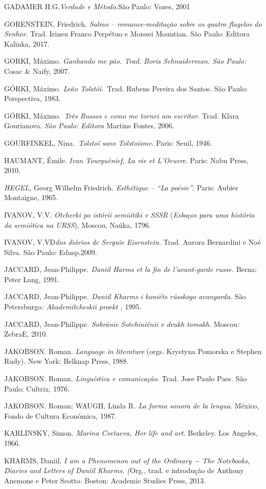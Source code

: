 GADAMER H.G.\emph{Verdade e Método.}São Paulo: Vozes, 2001

GORENSTEIN, Friedrich. \emph{Salmo -- romance-meditação sobre os quatro
flagelos do Senhor}. Trad. Irineu Franco Perpétuo e Moissei Mountian.
São Paulo: Editora Kalinka, 2017.

GORKI, Máximo. \emph{Ganhando me pão. Trad. Boris Schnaiderman. São
Paulo:} Cosac \& Naify, 2007.

GÓRKI, Máximo\emph{. Leão Tolstói}.~Trad. Rubens Pereira dos Santos. São
Paulo: Perspectiva, 1983.

GÓRKI, Máximo.~\emph{Três Russos e como me tornei um escritor.} Trad.
Klara Gourianova. \emph{São Paulo: Editora} Martins Fontes, 2006.

GOURFINKEL, Nina.~\emph{Tolstoï sans Tolstoïsme}. Paris: Seuil, 1946.

HAUMANT, Émile. \emph{Ivan Tourguénief, La vie et L'Oeuvre}. Paris: Nabu
Press, 2010.

\emph{HEGEL,} Georg Wilhelm Friedrich. \emph{Esthétique -- ``La
poésie''}. Paris: Aubier Montaigne, 1965.

IVANOV, V.V. \emph{Otcherki po istórii semiótiki v SSSR} (\emph{Esboços
para uma história da semiótica na URSS}), Moscou, Naúka, 1796.

IVANOV, V.VD\emph{dos diários de Serguie Eisenstein.} Trad. Aurora
Bernardini e Noé Silva. São Paulo: Edusp,2009.

JACCARD, Jean-Philippe. \emph{Daniil Harms et la fin de l'avant-garde
russe.} Berna: Peter Lang, 1991.~

JACCARD, Jean-Philippe\emph{. Daniil Kharms i koniéts rússkogo
avangarda.} São Petersburgo\emph{: Akademítcheskii proekt ,} 1995.

JACCARD, Jean-Philippe\emph{. Sobránie Sotchiniénii v dvukh tomakh}.
Moscou\emph{:} ZebraE, 2010.

JAKOBSON. Roman. \emph{Language in literature} (orgs. Krystyna Pomorska
e Stephen Rudy). New York: Belknap Press, 1988.

JAKOBSON. Roman. \emph{Linguística e comunicação}. Trad. Jose Paulo
Paes. São Paulo: Cultrix, 1976.

JAKOBSON. Roman; WAUGH, Linda R\emph{. La forma sonora de la lengua}.
México, Fondo de Cultura Económica, 1987.

KARLINSKY, Simon. \emph{Marina Cvetaeva, Her life and art}. Berkeley.
Los Angeles, 1966.

KHARMS, Daniil. \emph{I am a Phenomenon out of the Ordinary − The
Notebooks, Diaries and Letters of Daniil Kharms. (}Org., trad. e
introdução de Anthony Anemone e Peter Scotto. Boston: Academic Studies
Press, 2013.

